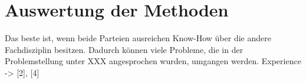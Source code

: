 \section{Auswertung der Methoden}

Das beste ist, wenn beide Parteien ausreichen Know-How über die andere Fachdisziplin besitzen. Dadurch können viele Probleme, die in der Problemstellung unter XXX angesprochen wurden, umgangen werden. 
Experience -> [2], [4]